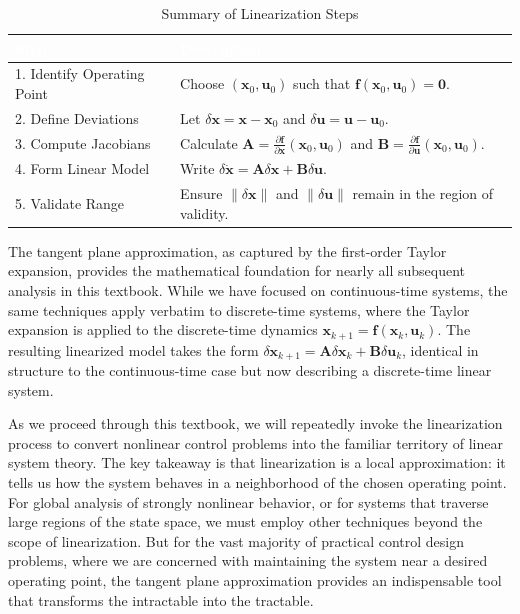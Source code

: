 \begin{table}[htbp]
\centering
\caption{Summary of Linearization Steps}
\begin{tabular}{|p{}|p{}|}
\hline
\rowcolor{UofSCGarnet}
\textcolor{white}{\textbf{Step}} & \textcolor{white}{\textbf{Description}} \\ \hline
1. Identify Operating Point & Choose $(\mathbf{x}_0, \mathbf{u}_0)$ such that $\mathbf{f}(\mathbf{x}_0, \mathbf{u}_0) = \mathbf{0}$. \\ \hline
2. Define Deviations & Let $\delta\mathbf{x} = \mathbf{x} - \mathbf{x}_0$ and $\delta\mathbf{u} = \mathbf{u} - \mathbf{u}_0$. \\ \hline
3. Compute Jacobians & Calculate $\mathbf{A} = \frac{\partial \mathbf{f}}{\partial \mathbf{x}}(\mathbf{x}_0, \mathbf{u}_0)$ and $\mathbf{B} = \frac{\partial \mathbf{f}}{\partial \mathbf{u}}(\mathbf{x}_0, \mathbf{u}_0)$. \\ \hline
4. Form Linear Model & Write $\delta\dot{\mathbf{x}} = \mathbf{A}\delta\mathbf{x} + \mathbf{B}\delta\mathbf{u}$. \\ \hline
5. Validate Range & Ensure $\|\delta\mathbf{x}\|$ and $\|\delta\mathbf{u}\|$ remain in the region of validity. \\ \hline
\end{tabular}
\end{table}

The tangent plane approximation, as captured by the first-order Taylor expansion, provides the mathematical foundation for nearly all subsequent analysis in this textbook. While we have focused on continuous-time systems, the same techniques apply verbatim to discrete-time systems, where the Taylor expansion is applied to the discrete-time dynamics $\mathbf{x}_{k+1} = \mathbf{f}(\mathbf{x}_k, \mathbf{u}_k)$. The resulting linearized model takes the form $\delta\mathbf{x}_{k+1} = \mathbf{A}\delta\mathbf{x}_k + \mathbf{B}\delta\mathbf{u}_k$, identical in structure to the continuous-time case but now describing a discrete-time linear system.

As we proceed through this textbook, we will repeatedly invoke the linearization process to convert nonlinear control problems into the familiar territory of linear system theory. The key takeaway is that linearization is a local approximation: it tells us how the system behaves in a neighborhood of the chosen operating point. For global analysis of strongly nonlinear behavior, or for systems that traverse large regions of the state space, we must employ other techniques beyond the scope of linearization. But for the vast majority of practical control design problems, where we are concerned with maintaining the system near a desired operating point, the tangent plane approximation provides an indispensable tool that transforms the intractable into the tractable.